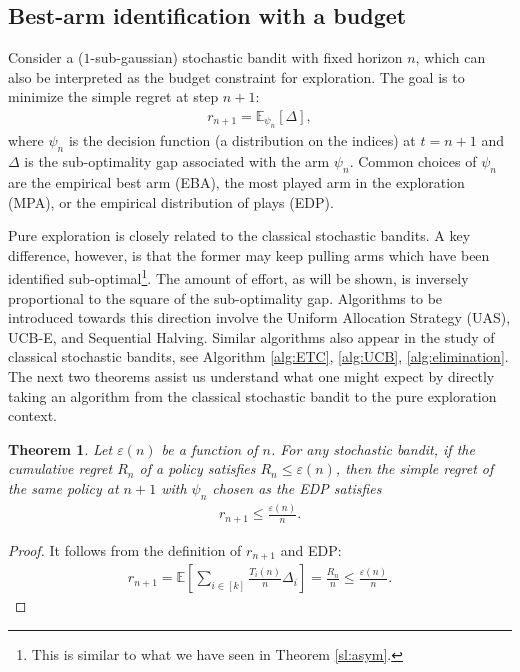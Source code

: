 \documentclass[10pt, openright]{book}
\numberwithin{equation}{section}
\theoremstyle{plain}
\newtheorem{Th}{Theorem}[section]
\theoremstyle{definition}
\def\E{{\mathbb E}}
\def\e{{\varepsilon}}
\begin{document}
\subsection{Best-arm identification with a budget}

Consider a ($1$-sub-gaussian) stochastic bandit with fixed horizon $n$, which can also be interpreted as the budget constraint for exploration.  The goal is to minimize the simple regret at step $n+1$:
\begin{align*}
r_{n+1} = \E_{\psi_n}[\Delta],
\end{align*}
where $\psi_n$ is the decision function (a distribution on the indices) at $t=n+1$ and $\Delta$ is the sub-optimality gap associated with the arm $\psi_n$. Common choices of $\psi_n$ are the empirical best arm (EBA), the most played arm in the exploration (MPA), or the empirical distribution of plays (EDP). 

Pure exploration is closely related to the classical stochastic bandits. A key difference, however, is that the former may keep pulling arms which have been identified sub-optimal\footnote{This is similar to what we have seen in Theorem \ref{sl:asym}.}. The amount of effort, as will be shown, is inversely proportional to the square of the sub-optimality gap. Algorithms to be introduced towards this direction involve the Uniform Allocation Strategy (UAS),  UCB-E, and Sequential Halving. Similar algorithms also appear in the study of classical stochastic bandits, see Algorithm \ref{alg:ETC}, \ref{alg:UCB}, \ref{alg:elimination}. The next two theorems assist us understand what one might expect by directly taking an algorithm from the classical stochastic bandit to the pure exploration context. 


\begin{Th}
Let $\e(n)$ be a function of $n$. For any stochastic bandit, if the cumulative regret $R_n$ of a policy satisfies $R_n\leq\e(n)$, then the simple regret of the same policy at $n+1$ with $\psi_n$ chosen as the EDP satisfies \begin{align*}
r_{n+1}\leq \frac{\e(n)}{n}.
\end{align*}  
\end{Th}
\begin{proof}
It follows from the definition of $r_{n+1}$ and EDP:
\begin{align*}
r_{n+1}=\E\left[\sum_{i\in [k]}\frac{T_i(n)}{n}\Delta_i\right]=\frac{R_n}{n}\leq\frac{\e (n)}{n}. 
\end{align*}
\end{proof}
\end{document}
